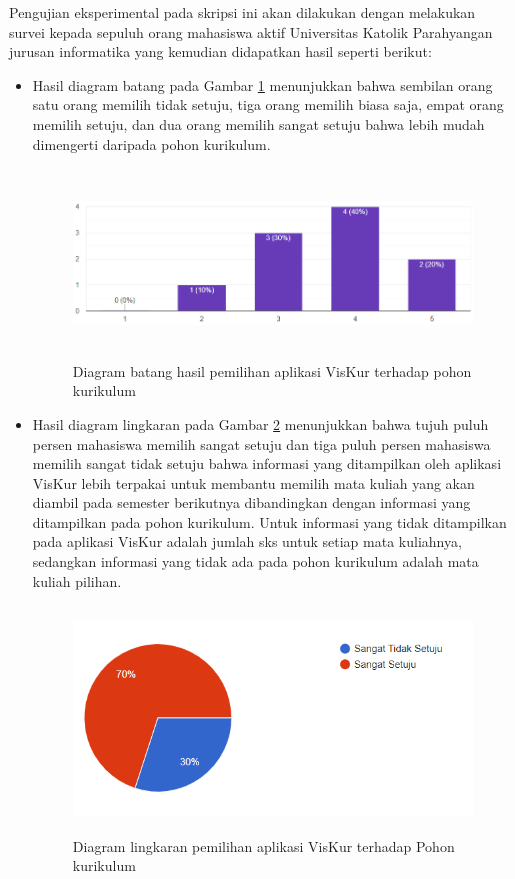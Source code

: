 Pengujian eksperimental pada skripsi ini akan dilakukan dengan melakukan survei kepada sepuluh orang mahasiswa aktif Universitas Katolik Parahyangan jurusan informatika yang kemudian didapatkan hasil seperti berikut:

\begin{itemize}
    \item Hasil diagram batang pada Gambar \ref{fig:gambarSurvei1} menunjukkan bahwa sembilan orang satu orang memilih tidak setuju, tiga orang memilih biasa saja, empat orang memilih setuju, dan dua orang memilih sangat setuju bahwa lebih mudah dimengerti daripada pohon kurikulum.
    
    \begin{figure}[H]
        \centering
        \includegraphics[width=12cm, height=5cm]{Gambar/survei1.png}
        \caption{Diagram batang hasil pemilihan aplikasi VisKur terhadap pohon kurikulum}
        \label{fig:gambarSurvei1}
    \end{figure}
    
    \item Hasil diagram lingkaran pada Gambar \ref{fig:gambarSurvei2} menunjukkan bahwa tujuh puluh persen mahasiswa memilih sangat setuju dan tiga puluh persen mahasiswa memilih sangat tidak setuju bahwa informasi yang ditampilkan oleh aplikasi VisKur lebih terpakai untuk membantu memilih mata kuliah yang akan diambil pada semester berikutnya dibandingkan dengan informasi yang ditampilkan pada pohon kurikulum. Untuk informasi yang tidak ditampilkan pada aplikasi VisKur adalah jumlah sks untuk setiap mata kuliahnya, sedangkan informasi yang tidak ada pada pohon kurikulum adalah mata kuliah pilihan.
    
    \begin{figure}[H]
        \centering
        \includegraphics[width=12cm, height=6cm]{Gambar/survei2.png}
        \caption{Diagram lingkaran pemilihan aplikasi VisKur terhadap Pohon kurikulum}
        \label{fig:gambarSurvei2}
    \end{figure}
    

\end{itemize}
